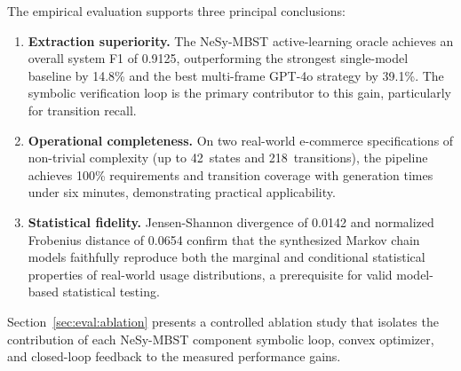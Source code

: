The empirical evaluation supports three principal conclusions:

\begin{enumerate}
    \item \textbf{Extraction superiority.} The NeSy-MBST active-learning
    oracle achieves an overall system F1 of 0.9125, outperforming the
    strongest single-model baseline by 14.8\% and the best multi-frame
    GPT-4o strategy by 39.1\%.  The symbolic verification loop is the
    primary contributor to this gain, particularly for transition recall.

    \item \textbf{Operational completeness.} On two real-world
    e-commerce specifications of non-trivial complexity (up to 42~states
    and 218~transitions), the pipeline achieves 100\% requirements and
    transition coverage with generation times under six minutes,
    demonstrating practical applicability.

    \item \textbf{Statistical fidelity.} Jensen-Shannon divergence of
    0.0142 and normalized Frobenius distance of 0.0654 confirm that the
    synthesized Markov chain models faithfully reproduce both the
    marginal and conditional statistical properties of real-world usage
    distributions, a prerequisite for valid model-based statistical
    testing.
\end{enumerate}

Section~\ref{sec:eval:ablation} presents a controlled ablation study
that isolates the contribution of each NeSy-MBST component symbolic
loop, convex optimizer, and closed-loop feedback to the measured
performance gains.
